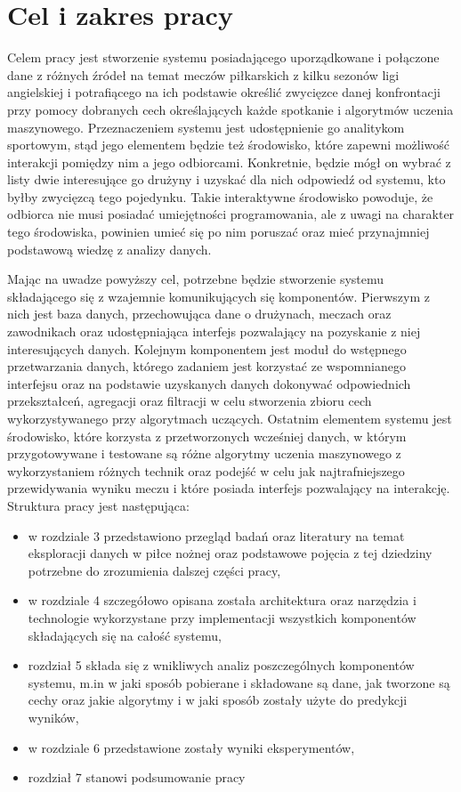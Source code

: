 \chapter{Cel i zakres pracy}

\noindent Celem pracy jest stworzenie systemu posiadającego uporządkowane i połączone dane z różnych źródeł na temat meczów piłkarskich z kilku sezonów ligi angielskiej i potrafiącego na ich podstawie określić zwycięzce danej konfrontacji przy pomocy dobranych cech określających każde spotkanie i algorytmów uczenia maszynowego. Przeznaczeniem systemu jest udostępnienie go analitykom sportowym, stąd jego elementem będzie też środowisko, które zapewni możliwość interakcji pomiędzy nim a jego odbiorcami. Konkretnie, będzie mógł on wybrać z listy dwie interesujące go drużyny i uzyskać dla nich odpowiedź od systemu, kto byłby zwycięzcą tego pojedynku. Takie interaktywne środowisko powoduje, że odbiorca nie musi posiadać umiejętności programowania, ale z uwagi na charakter tego środowiska, powinien umieć się po nim poruszać oraz mieć przynajmniej podstawową wiedzę z analizy danych.


Mając na uwadze powyższy cel, potrzebne będzie stworzenie systemu składającego się z wzajemnie komunikujących się komponentów. Pierwszym z nich jest baza danych, przechowująca dane o drużynach, meczach oraz zawodnikach oraz udostępniająca interfejs pozwalający na pozyskanie z niej interesujących danych. Kolejnym komponentem jest moduł do wstępnego przetwarzania danych, którego zadaniem jest korzystać ze wspomnianego interfejsu oraz na podstawie uzyskanych danych dokonywać odpowiednich przekształceń, agregacji oraz filtracji w celu stworzenia zbioru cech wykorzystywanego przy algorytmach uczących. Ostatnim elementem systemu jest środowisko, które korzysta z przetworzonych wcześniej danych, w którym przygotowywane i testowane są różne algorytmy uczenia maszynowego z wykorzystaniem różnych technik oraz podejść w celu jak najtrafniejszego przewidywania wyniku meczu i które posiada interfejs pozwalający na interakcję.
\\

\noindent Struktura pracy jest następująca:
\begin{itemize}
    \item w rozdziale 3 przedstawiono przegląd badań oraz literatury na temat eksploracji danych w piłce nożnej oraz podstawowe pojęcia z tej dziedziny potrzebne do zrozumienia dalszej części pracy,
    \item w rozdziale 4 szczegółowo opisana została architektura oraz narzędzia i technologie wykorzystane przy implementacji wszystkich komponentów składających się na całość systemu,
    \item rozdział 5 składa się z wnikliwych analiz poszczególnych komponentów systemu, m.in w jaki sposób pobierane i składowane są dane, jak tworzone są cechy oraz jakie algorytmy i w jaki sposób zostały użyte do predykcji wyników,
    \item w rozdziale 6 przedstawione zostały wyniki eksperymentów,
    \item rozdział 7 stanowi podsumowanie pracy
\end{itemize}

